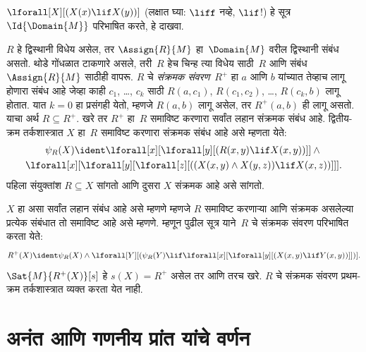 \begin{prob}
$\lforall[X][(X(x) \lif X(y))]$
(लक्षात घ्या:
$\liff$ नव्हे,
$\lif$!)
हे सूत्र
$\Id{\Domain{M}}$
परिभाषित करते,
हे दाखवा.
\end{prob}

\begin{ex}
$R$ हे
द्विस्थानी
विधेय
असेल, तर
$\Assign{R}{M}$
हा~$\Domain{M}$
वरील द्विस्थानी
संबंध असतो.
थोडे गोंधळात
टाकणारे असले,
तरी~$R$ हेच
चिन्ह त्या
विधेय
साठी~$R$ आणि
संबंध~$\Assign{R}{M}$
साठीही वापरू.
$R$ चे
\emph{संक्रमक
संवरण}~$R^+$
हा $a$
आणि $b$
यांच्यात तेव्हाच
लागू होणारा
संबंध आहे
जेव्हा काही
$c_1$, \dots, $c_k$
साठी
$R(a,c_1)$,
$R(c_1, c_2)$,
\dots, $R(c_k,b)$
लागू होतात.
यात $k = 0$
हा प्रसंगही
येतो, म्हणजे
$R(a,b)$
लागू असेल,
तर $R^+(a,b)$
ही लागू असतो.
याचा अर्थ
$R \subseteq R^+$.
खरे तर
$R^+$ हा~$R$
समाविष्ट करणारा
सर्वांत लहान
संक्रमक संबंध
आहे.
द्वितीय-क्रम
तर्कशास्त्रात
$X$ हा~$R$
समाविष्ट करणारा
संक्रमक संबंध
आहे असे
म्हणता येते:
\begin{multline*}
  \psi_R(X) \ident \lforall[x][\lforall[y][(R(x,y) \lif X(x, y))]] \land {}\\
\lforall[x][\lforall[y][\lforall[z][((X(x,y) \land X(y,z)) \lif X(x,
      z))]]].
\end{multline*}
पहिला संयुक्तांश
$R \subseteq X$
सांगतो आणि
दुसरा $X$
संक्रमक आहे
असे सांगतो.

$X$ हा
असा सर्वांत
लहान संबंध
आहे असे
म्हणणे म्हणजे
$R$ समाविष्ट
करणाऱ्या
आणि संक्रमक
असलेल्या
प्रत्येक संबंधात
तो समाविष्ट
आहे असे
म्हणणे.
म्हणून
पुढील
सूत्र
याने~$R$
चे संक्रमक
संवरण
परिभाषित
करता येते:
\[R^+(X) \ident \psi_R(X) \land \lforall[Y][(\psi_R(Y) \lif
  \lforall[x][\lforall[y][(X(x, y) \lif Y(x,y))]])].
\]
$\Sat{M}{R^+(X)}[s]$
हे
$s(X) = R^+$
असेल तर आणि
तरच खरे.
$R$ चे
संक्रमक संवरण
प्रथम-क्रम
तर्कशास्त्रात
व्यक्त करता
येत नाही.
\end{ex}












\section{अनंत आणि गणनीय
  प्रांत यांचे वर्णन}\label{sol:syn:siz:sec}


